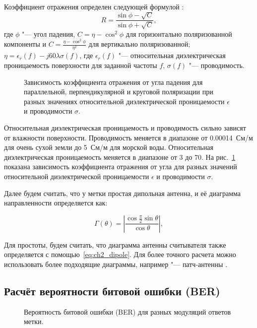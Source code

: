 Коэффициент отражения определен следующей формулой \cite{Gonzalez2013}:
$$
  R = \frac{\sin\phi - \sqrt{C}}{\sin\phi + \sqrt{C}},
$$
где $\phi$ "--- угол падения, $C = \eta - \cos^2\phi$ для горизонтально поляризованной компоненты и $C = \frac{\eta - \cos^2\phi}{\eta^2}$ для вертикально поляризованной; $\eta = \epsilon_r(f)-j60\lambda\sigma(f)$, где $\epsilon_r(f)$ "--- относительная диэлектрическая проницаемость поверхности для заданной частоты $f$, $\sigma(f)$ "--- проводимость.

\begin{figure}[!t]
	\caption{Зависимость коэффициента отражения от угла падения для параллельной, перпендикулярной и круговой поляризации при разных значениях относительной диэлектрической проницаемости $\epsilon$ и проводимости $\sigma$.}
	\label{fig:ch2_reflection}
\end{figure}

Относительная диэлектрическая проницаемость и проводимость сильно зависят от влажности поверхности. Проводимость меняется в диапазоне от 0.00014~См/м для очень сухой земли до 5~См/м для морской воды. Относительная диэлектрическая проницаемость меняется в диапазоне от 3 до 70. На рис.~\ref{fig:ch2_reflection} показана зависимость коэффициента отражения от угла для разных значений относительной диэлектрической проницаемости $\epsilon$ и проводимости $\sigma$.

Далее будем считать, что у метки простая дипольная антенна, и её диаграмма направленности определяется как:

\begin{equation}\label{eq:ch2_dipole}
	\Gamma(\theta) = \left|
		\frac{\cos{\frac{\pi}{2}\sin{\theta}}}{\cos{\theta}} \right|,
\end{equation}

Для простоты, будем считать, что диаграмма антенны считывателя также определяется с помощью~\eqref{eq:ch2_dipole}. Для более точного расчета можно использовать более подходящие диаграммы, например "--- патч-антенны \cite{Balanis2016}.




\subsection{Расчёт вероятности битовой ошибки (BER)}
\begin{figure}[!t]
	\caption{Вероятность битовой ошибки (BER) для разных модуляций ответов метки.}
	\label{fig:ch2_ber_miller}
\end{figure}

